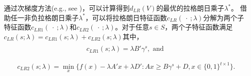 \documentclass[UTF8]{article}
\begin{document}
    通过次梯度方法(e.g., see \citealt{Ahuja1993NetworkBook})，可以计算得到$d_{LR}(V)$的最优的拉格朗日乘子$\lambda^*$。
    借助任一非负拉格朗日乘子$\lambda^*$，可以将拉格朗日特征函数$c_{LR}(\ \cdot\ ;\lambda)$分解为两个子特征函数$c_{LR1}(\ \cdot\ ;\lambda)$和$c_{LR2}(\ \cdot\ ;\lambda)$。对于任意$s \in S$，两个子特征函数满足$c_{LR}(s;\lambda) = c_{LR1}(s;\lambda) + c_{LR2}(s;\lambda)$其中，
    \begin{eqnarray}\label{eqn:subcf1}
    \begin{aligned}
    \begin{split}
    c_{LR1}(s;\lambda) = \lambda  B'\gamma^s, \mbox{ and }
    \end{split}
    \end{aligned}
    \end{eqnarray}
     \begin{eqnarray}\label{eqn:subcf2}
    \begin{aligned}
    \begin{split}
    c_{LR2}(s;\lambda) = \min_x \big\{ f(x)-\lambda A'x + \lambda D':Ax \geq B\gamma^s + D, x \in \{0,1\}^{t \times 1} \big\}.
    \end{split}
    \end{aligned}
    \end{eqnarray}
\end{document}
